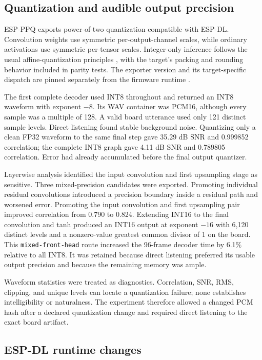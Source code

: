 \documentclass[10pt]{article}
\begin{document}
\subsection{Quantization and audible output precision}

ESP-PPQ exports power-of-two quantization compatible with ESP-DL. Convolution
weights use symmetric per-output-channel scales, while ordinary activations
use symmetric per-tensor scales. Integer-only inference follows the usual
affine-quantization principles \cite{jacob2018integer}, with the target's
packing and rounding behavior included in parity tests.
The exporter version and its target-specific dispatch are pinned separately
from the firmware runtime \cite{espressif2026espppq}.

The first complete decoder used INT8 throughout and returned an INT8 waveform
with exponent $-8$. Its WAV container was PCM16, although every sample was a
multiple of 128. A valid board utterance used only 121 distinct sample levels.
Direct listening found stable background noise. Quantizing only a clean FP32
waveform to the same final step gave 35.29 dB SNR and 0.999852 correlation;
the complete INT8 graph gave 4.11 dB SNR and 0.789805 correlation. Error had
already accumulated before the final output quantizer.

Layerwise analysis identified the input convolution and first upsampling
stage as sensitive. Three mixed-precision candidates were exported. Promoting
individual residual convolutions introduced a precision boundary inside a
residual path and worsened error. Promoting the input convolution and first
upsampling pair improved correlation from 0.790 to 0.824. Extending INT16 to
the final convolution and tanh produced an INT16 output at exponent $-16$
with 6,120 distinct levels and a nonzero-value greatest common divisor of 1
on the board. This \texttt{mixed-front-head} route increased the 96-frame
decoder time by 6.1\% relative to all INT8. It was retained because direct
listening preferred its usable output precision and because the remaining
memory was ample.

Waveform statistics were treated as diagnostics. Correlation, SNR, RMS,
clipping, and unique levels can locate a quantization failure; none establishes
intelligibility or naturalness. The experiment therefore allowed a changed
PCM hash after a declared quantization change and required direct listening to
the exact board artifact.

\subsection{ESP-DL runtime changes}
\label{sec:runtime}
\end{document}
